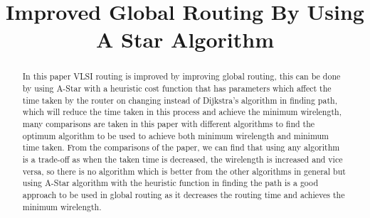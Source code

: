 \documentclass[conference]{IEEEtran}
\begin{document}

\title{Improved Global Routing By Using A Star Algorithm\\}


\author{
}


\maketitle


\begin{abstract}
    In this paper VLSI routing is improved by improving global routing, this can be done by using A-Star with a heuristic cost function that has parameters which affect the time taken by the router on changing instead of Dijkstra's algorithm in finding path, which will reduce the time taken in this process and achieve the minimum wirelength, many comparisons are taken in this paper with different algorithms to find the optimum algorithm to be used to achieve both minimum wirelength and minimum time taken. From the comparisons of the paper, we can find that using any algorithm is a trade-off as when the taken time is decreased, the wirelength is increased and vice versa, so there is no algorithm which is better from the other algorithms in general but using A-Star algorithm with the heuristic function in finding the path is a good approach to be used in global routing as it decreases the routing time and achieves the minimum wirelength.
\end{abstract}
\end{document}
